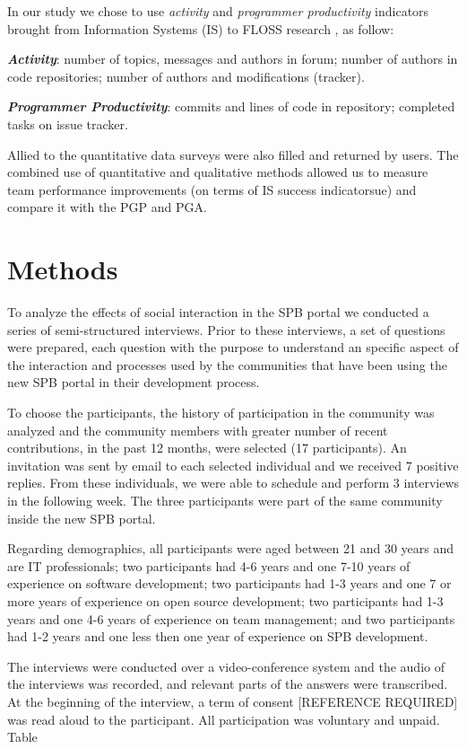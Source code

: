 \documentclass{sigchi}
\begin{document}
In our study we chose to use \textit{activity} and \textit{programmer productivity} indicators brought from Information Systems (IS) to FLOSS research \cite{Crowston2006}, as follow:

\textit{\textbf{Activity}}: number of topics, messages and authors in forum; number of authors in code repositories; number of authors and modifications (tracker).

\textit{\textbf{Programmer Productivity}}: commits and lines of code in repository; completed tasks on issue tracker.


Allied to the quantitative data surveys were also filled and returned by users. The combined use of quantitative and qualitative methods allowed us to measure team performance improvements (on terms of IS success indicatorsue) and compare it with the PGP and PGA.


\section{Methods}

To analyze the effects of social interaction in the SPB portal we conducted a series of semi-structured interviews. Prior to these interviews, a set of questions were prepared, each question with the purpose to understand an specific aspect of the interaction and processes used by the communities that have been using the new SPB portal in their development process. 

To choose the participants, the history of participation in the community was analyzed and the community members with greater number of recent contributions, in the past 12 months, were selected (17 participants). An invitation was sent by email to each selected individual and we received 7 positive replies. From these individuals, we were able to schedule and perform 3 interviews in the following week. The three participants were part of the same community inside the new SPB portal.

Regarding demographics, all participants were aged between 21 and 30 years and are IT professionals; two participants had 4-6 years and one 7-10 years of experience on software development; two participants had 1-3 years and one 7 or more years of experience on open source development; two participants had 1-3 years and one 4-6 years of experience on team management; and two participants had 1-2 years and one less then one year of experience on SPB development.

The interviews were conducted over a video-conference system and the audio of the interviews was recorded, and relevant parts of the answers were transcribed. At the beginning of the interview, a term of consent [REFERENCE REQUIRED] was read aloud to the participant. All participation was voluntary and unpaid. Table 
\end{document}
